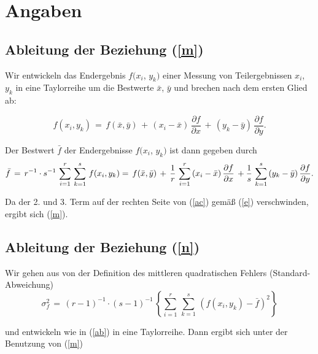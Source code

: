 \section{Angaben}


\subsection{Ableitung der Beziehung (\protect\ref{m}) }


Wir entwickeln das Endergebnis $f(x_{i}$, $y_{k})$ einer Messung von
Teilergebnissen $x_{i}$, $y_{k}$ in eine Taylorreihe um die Bestwerte
$\bar x$, $\bar y$ und brechen nach dem ersten Glied ab:

\begin{equation} \label{ab}
f(x_{i}, y_{k})\,=\,f(\bar x, \bar y)\,+\,(x_{i}-\bar x)\,\frac{\partial
 f}{\partial x}\,+\,(y_{k}-\bar y)\,\frac{\partial f}{\partial y}.
\end{equation}


Der Bestwert $\bar f$ der Endergebnisse $f(x_{i}$, $y_{k})$ ist dann gegeben durch\\

\begin{equation} \label{ac}
\bar f\,=\,r^{-1}\cdot
s^{-1}\,\sum_{i=1}^{r}\,\sum_{k=1}^{s}\,f(x_{i}, y_{k})\\
 =\,f(\bar x, \bar y)\,+\,\frac{1}{r}\,\sum_{i=1}^{r}\,(x_{i}-\bar
x)\,\frac{\partial f}{\partial
 x}\,+\frac{1}{s}\,\sum_{k=1}^{s}\,(y_{k}-\bar y)\,\frac{\partial
 f}{\partial y}.
\end{equation}

Da der 2. und 3. Term auf der rechten Seite von (\ref{ac}) gemäß
(\ref{e}) verschwinden, ergibt sich (\ref{m}).\\


\subsection{Ableitung der Beziehung (\protect\ref{n})}


Wir gehen aus von der Definition des mittleren quadratischen Fehlers (Standard-Abweichung)\\

\begin{equation} \label{ad}
\sigma_{f}^{2}\,=\,(r-1)^{-1}\cdot
(s-1)^{-1}\,\left\{\sum_{i=1}^{r}\,\sum_{k=1}^{s}\,(f(x_{i},
 y_{k})-\bar f)^{2}\right\}
\end{equation}

und entwickeln wie in (\ref{ab}) in eine Taylorreihe. Dann ergibt sich
unter der Benutzung von (\ref{m})\\

